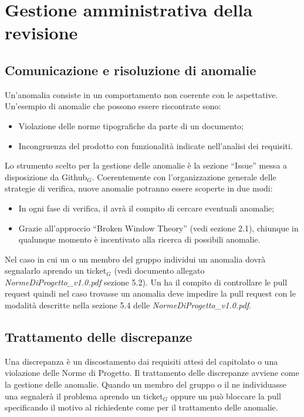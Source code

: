 \section{Gestione amministrativa della revisione}
\subsection{Comunicazione e risoluzione di anomalie}
Un'anomalia consiste in un comportamento non coerente con le aspettative. Un'esempio di anomalie che possono essere riscontrate sono:
\begin{itemize}
	\item Violazione delle norme tipografiche da parte di un documento;
	\item Incongruenza del prodotto con funzionalità indicate nell'analisi dei requisiti.
\end{itemize}
Lo strumento scelto per la gestione delle anomalie è la sezione ``Issue'' messa a disposizione da Github$_G$. Coerentemente con l'organizzazione generale delle strategie di verifica, nuove anomalie potranno essere scoperte in due modi:

\begin{itemize}
	\item In ogni fase di verifica, il \ruoloVerificatore avrà il compito di cercare eventuali anomalie;
	\item Grazie all'approccio ``Broken Window Theory'' (vedi sezione 2.1), chiunque in qualunque momento è incentivato alla ricerca di possibili anomalie.
\end{itemize}
Nel caso in cui un \ruoloVerificatore o un membro del gruppo individui un anomalia dovrà segnalarlo aprendo un ticket$_G$ (vedi documento allegato \textit{NormeDiProgetto\_v1.0.pdf} sezione 5.2). Un \ruoloVerificatore ha il compito di controllare le pull request quindi nel caso trovasse un anomalia deve impedire la pull request con le modalità descritte nella sezione 5.4 delle \textit{NormeDiProgetto\_v1.0.pdf}.

\subsection{Trattamento delle discrepanze}
Una discrepanza è un discostamento dai requisiti attesi del capitolato o una violazione delle Norme di Progetto. Il trattamento delle discrepanze avviene come la gestione delle anomalie. Quando un membro del gruppo o il \ruoloVerificatore ne individuasse una segnalerà il problema aprendo un ticket$_G$ oppure un \ruoloVerificatore può bloccare la pull specificando il motivo al richiedente come per il trattamento delle anomalie.
